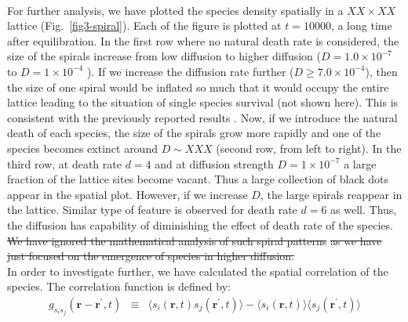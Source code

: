 \documentclass[aps, pre, twocolumn, amsmath, superscriptaddress,showkeys,showpacs]{revtex4-1}
\begin{document}
\\
For further analysis, we have plotted the species density spatially in a {\color{red} $XX\times XX$ lattice} (Fig.\  \ref{fig3-spiral}). {\color{red} Each of the figure is plotted at $t=10000$, a long time after equilibration.} In the first row where no natural death rate is considered, the size of the spirals increase from low diffusion to higher diffusion ($D=1.0\times 10^{-7}$ to $D=1\times 10^{-4}$ ). {\color{red}If we increase the diffusion rate further ($D\geq7.0\times 10^{-4}$), then the size of one spiral would be inflated so much that it would occupy the entire lattice leading to the situation of single species survival (not shown here).} %
This is consistent with the previously reported results \cite{reichenbach2007mobility}.   Now, if we introduce the natural death of each species, the size of the spirals grow more rapidly and {\color{red}one of the species becomes extinct around $D\sim XXX$ (second row, from left to right). In the third row, at death rate $d=4$} and at diffusion strength $D=1\times 10^{-7}$ a large fraction of the lattice sites become vacant. Thus a large collection of black dots appear in the spatial plot. However, if we increase $D$, the large spirals reappear in the lattice. Similar type of feature is observed for death rate $d=6$ as well. {\color{red}Thus, the diffusion has capability of diminishing the effect of death rate of the species. \st{We have ignored the mathematical analysis of such spiral patterns} \cite{ipsen2000amplitude,ipsen2000amplitudee,gong2003antispiral,mondal2019diffusion} \st{as we have just focused on the emergence of species in higher diffusion.}} \\
In order to investigate further, we have calculated the spatial correlation of the species. The correlation function is defined by:
	\begin{eqnarray}
g_{s_i s_j}(\mathbf{r}-\mathbf{r^\prime} , t) &\equiv& \langle s_i(\mathbf{r},t) s_j(\mathbf{r^\prime},t) \rangle -\langle s_i(\mathbf{r},t) \rangle  \langle  s_j(\mathbf{r^\prime},t) \rangle
\end{eqnarray}
\noindent
\end{document}
